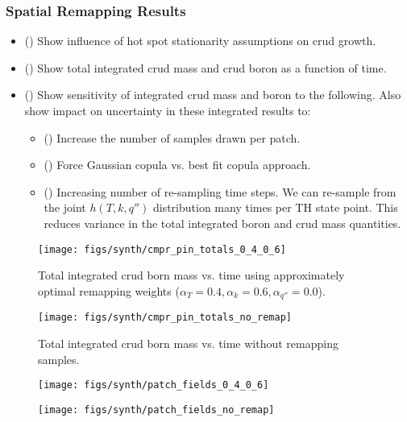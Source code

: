 \subsubsection{Spatial Remapping Results}
\begin{itemize}
	\item (\checkmark) Show influence of hot spot stationarity assumptions on crud growth.
\end{itemize}

\begin{itemize}
	\item (\checkmark) Show total integrated crud mass and crud boron as a function of time.
	\item (\checkmark) Show sensitivity of integrated crud mass and boron to the following.  Also show impact on uncertainty in these integrated results to:
	\begin{itemize}
		\item (\checkmark) Increase the number of samples drawn per patch.
		\item (\checkmark) Force Gaussian copula vs. best fit copula approach.
		\item (\checkmark) Increasing number of re-sampling time steps.
		We can re-sample from the joint $h(T, k, q'')$ distribution many times per TH state point.
		This reduces variance in the total integrated boron and crud mass quantities.
	\end{itemize}
\end{itemize}

\begin{figure}[H]
    \centering
    \texttt{[image: figs/synth/cmpr\_pin\_totals\_0\_4\_0\_6]}
    \caption[Total integrated crud born mass vs. time using approximately optimal remapping weights.]{Total integrated crud born mass vs. time using approximately optimal remapping weights ($\alpha_T=0.4, \alpha_{k}=0.6, \alpha_{q''}=0.0$).}
    \label{fig:cmprpintotals0406}
\end{figure}

\begin{figure}[H]
    \centering
    \texttt{[image: figs/synth/cmpr\_pin\_totals\_no\_remap]}
    \caption{Total integrated crud born mass vs. time without remapping samples.}
    \label{fig:cmprpintotalsnoremap}
\end{figure}

\begin{figure}[H]
    \centering
    \texttt{[image: figs/synth/patch\_fields\_0\_4\_0\_6]}
    \caption{}
    \label{fig:patchfields0406}
\end{figure}
\begin{figure}[H]
    \centering
    \texttt{[image: figs/synth/patch\_fields\_no\_remap]}
    \caption{}
    \label{fig:patchfieldsnoremap}
\end{figure}


